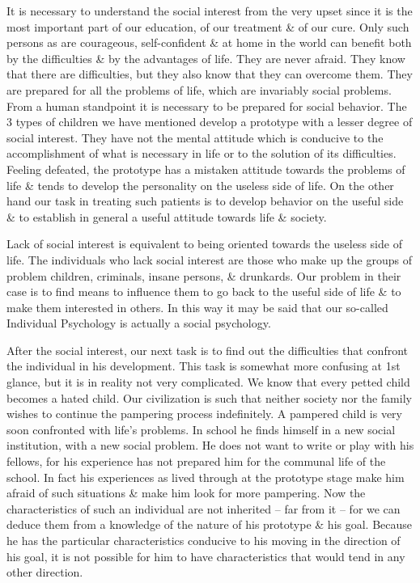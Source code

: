 \documentclass{article}
\begin{document}
It is necessary to understand the social interest from the very upset since it is the most important part of our education, of our treatment \& of our cure. Only such persons as are courageous, self-confident \& at home in the world can benefit both by the difficulties \& by the advantages of life. They are never afraid. They know that there are difficulties, but they also know that they can overcome them. They are prepared for all the problems of life, which are invariably social problems. From a human standpoint it is necessary to be prepared for social behavior. The 3 types of children we have mentioned develop a prototype with a lesser degree of social interest. They have not the mental attitude which is conducive to the accomplishment of what is necessary in life or to the solution of its difficulties. Feeling defeated, the prototype has a mistaken attitude towards the problems of life \& tends to develop the personality on the useless side of life. On the other hand our task in treating such patients is to develop behavior on the useful side \& to establish in general a useful attitude towards life \& society.

Lack of social interest is equivalent to being oriented towards the useless side of life. The individuals who lack social interest are those who make up the groups of problem children, criminals, insane persons, \& drunkards. Our problem in their case is to find means to influence them to go back to the useful side of life \& to make them interested in others. In this way it may be said that our so-called Individual Psychology is actually a social psychology.

After the social interest, our next task is to find out the difficulties that confront the individual in his development. This task is somewhat more confusing at 1st glance, but it is in reality not very complicated. We know that every petted child becomes a hated child. Our civilization is such that neither society nor the family wishes to continue the pampering process indefinitely. A pampered child is very soon confronted with life's problems. In school he finds himself in a new social institution, with a new social problem. He does not want to write or play with his fellows, for his experience has not prepared him for the communal life of the school. In fact his experiences as lived through at the prototype stage make him afraid of such situations \& make him look for more pampering. Now the characteristics of such an individual are not inherited -- far from it -- for we can deduce them from a knowledge of the nature of his prototype \& his goal. Because he has the particular characteristics conducive to his moving in the direction of his goal, it is not possible for him to have characteristics that would tend in any other direction.
\end{document}

